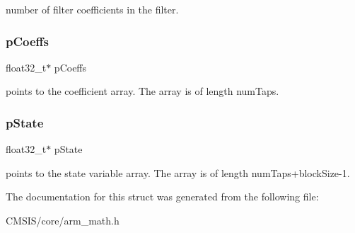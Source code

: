 number of filter coefficients in the filter. \mbox{\label{structarm__fir__instance__f32_aacbb8dd8eeba4b21fc2bb40076405ee3}} 
\subsubsection{\texorpdfstring{p\+Coeffs}{pCoeffs}}
{\footnotesize\ttfamily float32\+\_\+t$\ast$ p\+Coeffs}

points to the coefficient array. The array is of length num\+Taps. \mbox{\label{structarm__fir__instance__f32_a335c87e6fdc4b96601d95a5de8b9c463}} 
\subsubsection{\texorpdfstring{p\+State}{pState}}
{\footnotesize\ttfamily float32\+\_\+t$\ast$ p\+State}

points to the state variable array. The array is of length num\+Taps+block\+Size-\/1. 

The documentation for this struct was generated from the following file\+:\begin{DoxyCompactItemize}
\item 
C\+M\+S\+I\+S/core/arm\+\_\+math.\+h\end{DoxyCompactItemize}
